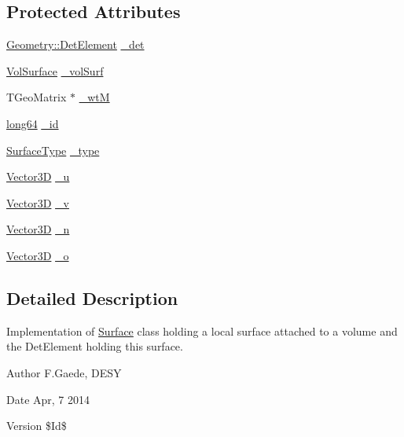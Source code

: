 \subsection*{Protected Attributes}
\begin{DoxyCompactItemize}
\item 
\hyperlink{class_d_d4hep_1_1_geometry_1_1_det_element}{Geometry::DetElement} \hyperlink{class_d_d4hep_1_1_d_d_rec_1_1_surface_a41a9849864ae0888964242798aaaa8e8}{\_\-det}
\item 
\hyperlink{class_d_d4hep_1_1_d_d_rec_1_1_vol_surface}{VolSurface} \hyperlink{class_d_d4hep_1_1_d_d_rec_1_1_surface_a5555dbcfaaa833c3169aec39f447b2c3}{\_\-volSurf}
\item 
TGeoMatrix $\ast$ \hyperlink{class_d_d4hep_1_1_d_d_rec_1_1_surface_acbbdd616ea4e084228084cd6d94dff99}{\_\-wtM}
\item 
\hyperlink{namespace_d_d4hep_ac2a70e722b33dc7ddaa20db8954ac836}{long64} \hyperlink{class_d_d4hep_1_1_d_d_rec_1_1_surface_a14744685350bb3023c3e2efe02f8d707}{\_\-id}
\item 
\hyperlink{class_d_d_surfaces_1_1_surface_type}{SurfaceType} \hyperlink{class_d_d4hep_1_1_d_d_rec_1_1_surface_a1abb4367c088376f8607c45f9faaddb8}{\_\-type}
\item 
\hyperlink{class_d_d_surfaces_1_1_vector3_d}{Vector3D} \hyperlink{class_d_d4hep_1_1_d_d_rec_1_1_surface_abbf2e76e33b536bac67c387b860c1ff4}{\_\-u}
\item 
\hyperlink{class_d_d_surfaces_1_1_vector3_d}{Vector3D} \hyperlink{class_d_d4hep_1_1_d_d_rec_1_1_surface_a12656a8ed5ccc5a1993e1bacf9d4624b}{\_\-v}
\item 
\hyperlink{class_d_d_surfaces_1_1_vector3_d}{Vector3D} \hyperlink{class_d_d4hep_1_1_d_d_rec_1_1_surface_a9191ee82058481753f4d5d5234415382}{\_\-n}
\item 
\hyperlink{class_d_d_surfaces_1_1_vector3_d}{Vector3D} \hyperlink{class_d_d4hep_1_1_d_d_rec_1_1_surface_aab036a2e1a02dcc393f03a901fea39d4}{\_\-o}
\end{DoxyCompactItemize}


\subsection{Detailed Description}
Implementation of \hyperlink{class_d_d4hep_1_1_d_d_rec_1_1_surface}{Surface} class holding a local surface attached to a volume and the DetElement holding this surface.

\begin{DoxyAuthor}{Author}
F.Gaede, DESY 
\end{DoxyAuthor}
\begin{DoxyDate}{Date}
Apr, 7 2014 
\end{DoxyDate}
\begin{DoxyVersion}{Version}
\$Id\$ 
\end{DoxyVersion}


